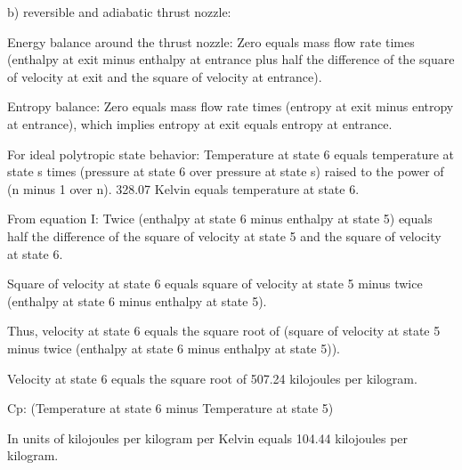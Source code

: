 b) reversible and adiabatic thrust nozzle:

Energy balance around the thrust nozzle:
Zero equals mass flow rate times (enthalpy at exit minus enthalpy at entrance plus half the difference of the square of velocity at exit and the square of velocity at entrance).

Entropy balance:
Zero equals mass flow rate times (entropy at exit minus entropy at entrance), which implies entropy at exit equals entropy at entrance.

For ideal polytropic state behavior:
Temperature at state 6 equals temperature at state s times (pressure at state 6 over pressure at state s) raised to the power of (n minus 1 over n).
328.07 Kelvin equals temperature at state 6.

From equation I:
Twice (enthalpy at state 6 minus enthalpy at state 5) equals half the difference of the square of velocity at state 5 and the square of velocity at state 6.

Square of velocity at state 6 equals square of velocity at state 5 minus twice (enthalpy at state 6 minus enthalpy at state 5).

Thus, velocity at state 6 equals the square root of (square of velocity at state 5 minus twice (enthalpy at state 6 minus enthalpy at state 5)).

Velocity at state 6 equals the square root of 507.24 kilojoules per kilogram.

Cp: (Temperature at state 6 minus Temperature at state 5)

In units of kilojoules per kilogram per Kelvin equals 104.44 kilojoules per kilogram.